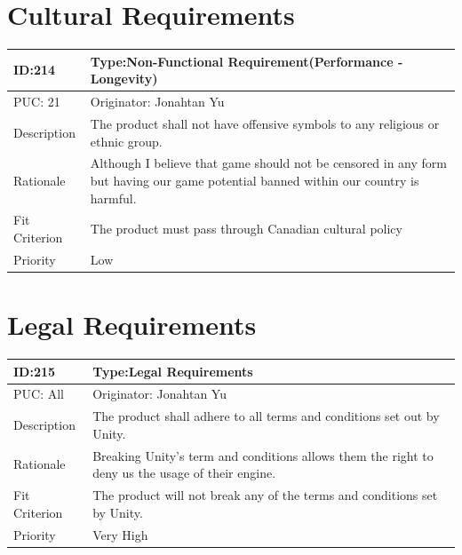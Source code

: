 \documentclass{article}
\begin{document}
	\section{Cultural Requirements}
	\begin{table}[H]
		\begin{tabular}{|l|l|l|}
			\hline
			ID:214 & \multicolumn{2}{l|}{Type:Non-Functional Requirement(Performance - Longevity)} \\ \hline
			PUC: 21 & \multicolumn{2}{l|}{Originator: Jonahtan Yu} \\ \hline
			Description & \multicolumn{2}{m{0.85\textwidth}|}{The product shall not have offensive symbols to any religious or ethnic group.} \\ \hline
			Rationale & \multicolumn{2}{m{0.85\textwidth}|}{Although I believe that game should not be censored in any form but having our game potential banned within our country is harmful.} \\ \hline
			Fit Criterion & \multicolumn{2}{m{0.85\textwidth}|}{The product must pass through Canadian cultural policy} \\ \hline
			Priority& \multicolumn{2}{m{0.85\textwidth}|}{Low }\\ \hline
		\end{tabular}
	\end{table}

	\section{Legal Requirements}
	\begin{table}[H]
		\begin{tabular}{|l|l|l|}
			\hline
			ID:215 & \multicolumn{2}{l|}{Type:Legal Requirements} \\ \hline
			PUC: All & \multicolumn{2}{l|}{Originator: Jonahtan Yu} \\ \hline
			Description & \multicolumn{2}{m{0.85\textwidth}|}{The product shall adhere to all terms and conditions set out by Unity.} \\ \hline
			Rationale & \multicolumn{2}{m{0.85\textwidth}|}{Breaking Unity’s term and conditions allows them the right to deny us the usage of their engine.} \\ \hline
			Fit Criterion & \multicolumn{2}{m{0.85\textwidth}|}{The product will not break any of the terms and conditions set by Unity.} \\ \hline
			Priority& \multicolumn{2}{m{0.85\textwidth}|}{Very High} \\ \hline
		\end{tabular}
	\end{table}
\end{document}
